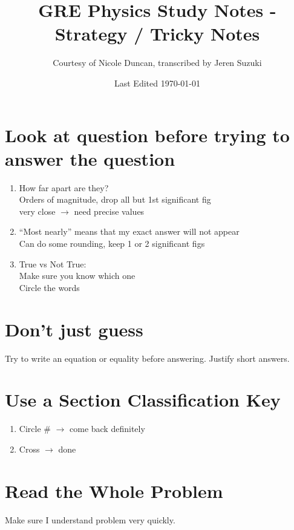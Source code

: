 \documentclass[10pt,a4paper]{article}
\title{GRE Physics Study Notes - Strategy / Tricky Notes}
\author{Courtesy of Nicole Duncan, transcribed by Jeren Suzuki}
\date{Last Edited \today}
\begin{document}
\maketitle
{}
\newpage
\tableofcontents
\newpage
{}


\section{Look at question before trying to answer the question}
\begin{enumerate}
    \item How far apart are they? \\ 
    Orders of magnitude, drop all but 1st significant fig\\
    very close $\rightarrow$ need precise values
    \item ``Most nearly'' means that my exact answer will not appear\\
    Can do some rounding, keep 1 or 2 significant figs
    \item True vs Not True: \\
    Make sure you know which one\\
    Circle the words
\end{enumerate}

\section{Don't just guess} %
\label{sec:don_t_just_guess}
Try to write an equation or equality before answering. Justify short answers.

\section{Use a Section Classification Key} %
\label{sec:use_a_section_classification_key}
\begin{enumerate}
    \item Circle \# $\rightarrow$ come back definitely 
    \item Cross $\rightarrow$ done
\end{enumerate}

\section{Read the Whole Problem} %
\label{sec:read_the_whole_problem}
Make sure I understand problem very quickly.
\end{document}
